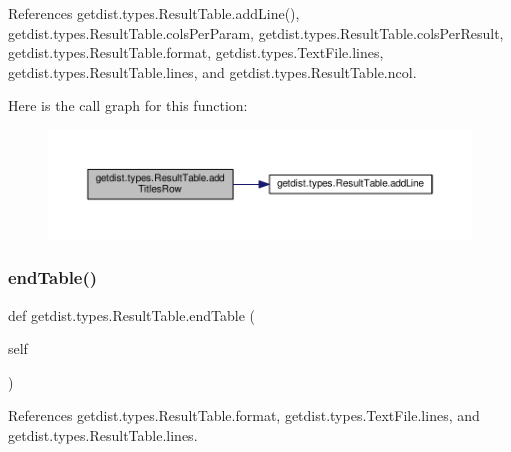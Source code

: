 References getdist.\+types.\+Result\+Table.\+add\+Line(), getdist.\+types.\+Result\+Table.\+cols\+Per\+Param, getdist.\+types.\+Result\+Table.\+cols\+Per\+Result, getdist.\+types.\+Result\+Table.\+format, getdist.\+types.\+Text\+File.\+lines, getdist.\+types.\+Result\+Table.\+lines, and getdist.\+types.\+Result\+Table.\+ncol.

Here is the call graph for this function\+:
\nopagebreak
\begin{figure}[H]
\begin{center}
\leavevmode
\includegraphics[width=350pt]{classgetdist_1_1types_1_1ResultTable_ae953a90c736afd2c64411202fc8cb08f_cgraph}
\end{center}
\end{figure}
\mbox{\label{classgetdist_1_1types_1_1ResultTable_a286ee12621c18db5a76b4b5f9c1b1eb6}} 
\subsubsection{\texorpdfstring{end\+Table()}{endTable()}}
{\footnotesize\ttfamily def getdist.\+types.\+Result\+Table.\+end\+Table (\begin{DoxyParamCaption}\item[{}]{self }\end{DoxyParamCaption})}



References getdist.\+types.\+Result\+Table.\+format, getdist.\+types.\+Text\+File.\+lines, and getdist.\+types.\+Result\+Table.\+lines.

\mbox{\label{classgetdist_1_1types_1_1ResultTable_ae48ef77cd332e1199779bd19aca6d8a3}} 
